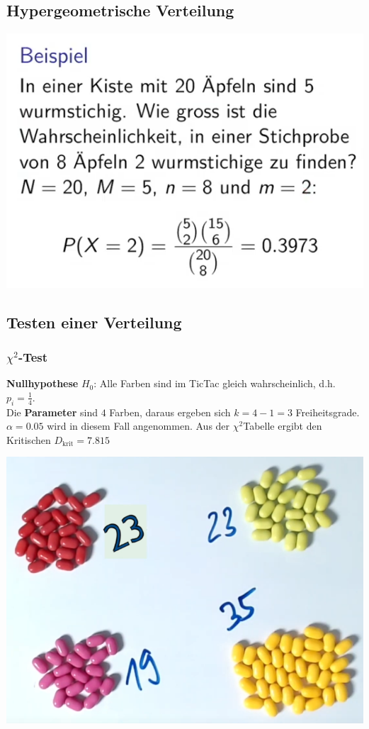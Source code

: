 \subsection{Hypergeometrische Verteilung}
\includegraphics[width=\columnwidth]{Images/hyergeom.verteilung}

\subsection{Testen einer Verteilung}
\subsubsection{$\chi^2$-Test}\label{tictac}
\textbf{Nullhypothese} $H_0$: Alle Farben sind im TicTac gleich wahrscheinlich, d.h. $p_i = \frac{1}{4}$.\\
Die \textbf{Parameter} sind $4$ Farben, daraus ergeben sich $k= 4 -1 = 3$ Freiheitsgrade. $\alpha = 0.05$ wird in diesem Fall angenommen. Aus der $\chi^2$Tabelle ergibt den Kritischen $D_\text{krit} = 7.815$
\begin{center}
	\includegraphics[width=0.8\columnwidth]{Images/tictac}
\end{center}

